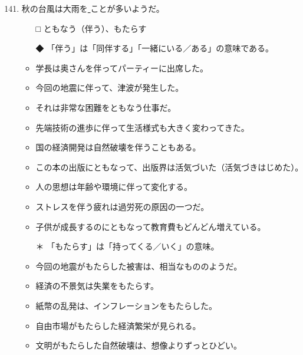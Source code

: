 \documentclass[
uplatex,
b5paper,
10pt,
dvipdfmx
]{jsbook}
\begin{document}
\begin{enumerate}
\setcounter{enumi}{140}
\item 秋の台風は大雨を\underline{     }ことが多いようだ。
\begin{itemize}
\item[□] ともなう（伴う）、もたらす
\item[◆] 「伴う」は「同伴する」「一緒にいる／ある」の意味である。
\end{itemize}
\begin{itemize}
\item 学長は奥さんを伴ってパーティーに出席した。
\item 今回の地震に伴って、津波が発生した。
\item それは非常な困難をともなう仕事だ。
\item 先端技術の進歩に伴って生活様式も大きく変わってきた。
\item 国の経済開発は自然破壊を伴うこともある。
\item この本の出版にともなって、出版界は活気づいた（活気づきはじめた）。
\item 人の思想は年齢や環境に伴って変化する。
\item ストレスを伴う疲れは過労死の原因の一つだ。
\item 子供が成長するのにともなって教育費もどんどん増えている。
\end{itemize}

\begin{itemize}
\item[＊] 「もたらす」は「持ってくる／いく」の意味。
\item 今回の地震がもたらした被害は、相当なもののようだ。
\item 経済の不景気は失業をもたらす。
\item 紙幣の乱発は、インフレーションをもたらした。
\item 自由市場がもたらした経済繁栄が見られる。
\item 文明がもたらした自然破壊は、想像よりずっとひどい。
\end{itemize}


\end{enumerate}
\end{document}
